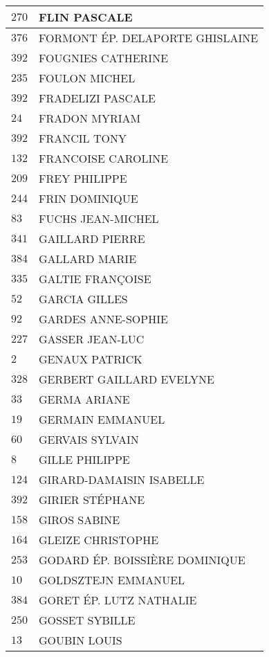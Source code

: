 \begin{xltabular}{\linewidth}{|l|X|}
    \hline
    $270$ & FLIN PASCALE \\
    \hline
    $376$ & FORMONT ÉP. DELAPORTE GHISLAINE \\
    \hline
    $392$ & FOUGNIES CATHERINE \\
    \hline
    $235$ & FOULON MICHEL \\
    \hline
    $392$ & FRADELIZI PASCALE \\
    \hline
    $24$ & FRADON MYRIAM \\
    \hline
    $392$ & FRANCIL TONY \\
    \hline
    $132$ & FRANCOISE CAROLINE \\
    \hline
    $209$ & FREY PHILIPPE \\
    \hline
    $244$ & FRIN DOMINIQUE \\
    \hline
    $83$ & FUCHS JEAN-MICHEL \\
    \hline
    $341$ & GAILLARD PIERRE \\
    \hline
    $384$ & GALLARD MARIE \\
    \hline
    $335$ & GALTIE FRANÇOISE \\
    \hline
    $52$ & GARCIA GILLES \\
    \hline
    $92$ & GARDES ANNE-SOPHIE \\
    \hline
    $227$ & GASSER JEAN-LUC \\
    \hline
    $2$ & GENAUX PATRICK \\
    \hline
    $328$ & GERBERT GAILLARD EVELYNE \\
    \hline
    $33$ & GERMA ARIANE \\
    \hline
    $19$ & GERMAIN EMMANUEL \\
    \hline
    $60$ & GERVAIS SYLVAIN \\
    \hline
    $8$ & GILLE PHILIPPE \\
    \hline
    $124$ & GIRARD-DAMAISIN ISABELLE \\
    \hline
    $392$ & GIRIER STÉPHANE \\
    \hline
    $158$ & GIROS SABINE \\
    \hline
    $164$ & GLEIZE CHRISTOPHE \\
    \hline
    $253$ & GODARD ÉP. BOISSIÈRE DOMINIQUE \\
    \hline
    $10$ & GOLDSZTEJN EMMANUEL \\
    \hline
    $384$ & GORET ÉP. LUTZ NATHALIE \\
    \hline
    $250$ & GOSSET SYBILLE \\
    \hline
    $13$ & GOUBIN LOUIS \\

\end{xltabular}

